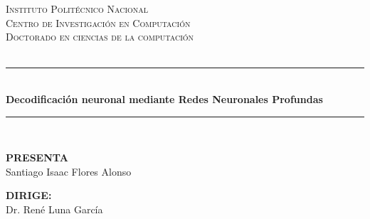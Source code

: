 \begin{titlepage}

\begin{center}
\newcommand{\HRule}{\rule{\linewidth}{0.5mm}}



\textsc{\LARGE Instituto Politécnico Nacional}\\[0.5cm]
\textsc{\LARGE Centro de Investigación en Computación }\\[1.5cm]

\textsc{\Large Doctorado en ciencias de la computación }\\[0.5cm]
\textsc{\Large }\\[0.5cm]

\HRule \\[0.4cm]
{ \huge \bfseries Decodificación neuronal mediante Redes Neuronales Profundas}\\[0.1cm]
\HRule \\[1cm]


\begin{minipage}{0.8\textwidth}
\begin{center} \large
\textbf{PRESENTA}\\
Santiago Isaac Flores Alonso\\
	
	

\end{center}
\end{minipage}

\bigskip
\large \textbf{DIRIGE:}\\
{\large} Dr. René Luna García
\end{center}

\end{titlepage}